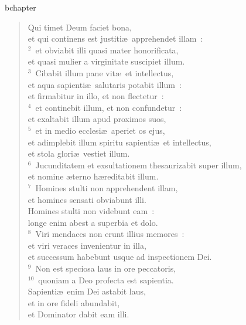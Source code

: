 bchapter\begin{verse}\vspace{-19pt}Qui timet Deum faciet bona,\\ et qui continens est justiti\ae\ apprehendet illam~:\\
${}^{2}$~et obviabit illi quasi mater honorificata,\\ et quasi mulier a virginitate suscipiet illum.\\
${}^{3}$~Cibabit illum pane vit\ae\ et intellectus,\\ et aqua sapienti\ae\ salutaris potabit illum~:\\ et firmabitur in illo, et non flectetur~:\\
${}^{4}$~et continebit illum, et non confundetur~:\\ et exaltabit illum apud proximos suos,\\
${}^{5}$~et in medio ecclesi\ae\ aperiet os ejus,\\ et adimplebit illum spiritu sapienti\ae\ et intellectus,\\ et stola glori\ae\ vestiet illum.\\
${}^{6}$~Jucunditatem et exsultationem thesaurizabit super illum,\\ et nomine \ae terno h\ae reditabit illum.\\
${}^{7}$~Homines stulti non apprehendent illam,\\ et homines sensati obviabunt illi.\\ Homines stulti non videbunt eam~:\\ longe enim abest a superbia et dolo.\\
${}^{8}$~Viri mendaces non erunt illius memores~:\\ et viri veraces invenientur in illa,\\ et successum habebunt usque ad inspectionem Dei.\\
${}^{9}$~Non est speciosa laus in ore peccatoris,\\
${}^{10}$~quoniam a Deo profecta est sapientia.\\ Sapienti\ae\ enim Dei astabit laus,\\ et in ore fideli abundabit,\\ et Dominator dabit eam illi.\end{verse}


